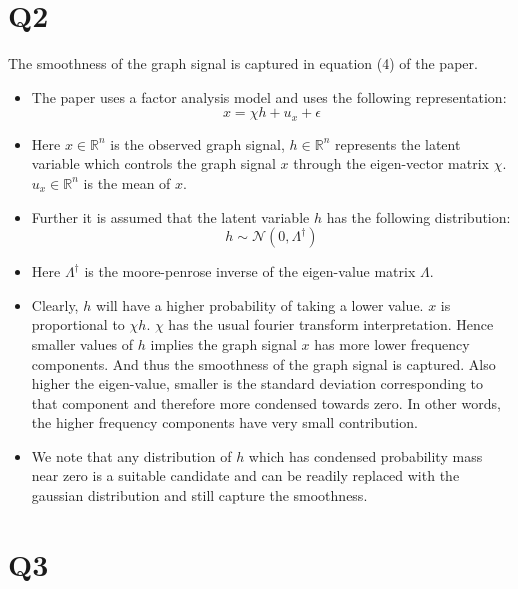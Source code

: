 \documentclass{article}
\begin{document}
\section*{Q2}
The smoothness of the graph signal is captured in equation (4) of the paper.
\begin{itemize}
\item The paper uses a factor analysis model and uses the following representation:
  $$ x = \chi h + u_x + \epsilon$$
\item Here $x \in \mathbb{R}^n$ is the observed graph signal, $h \in \mathbb{R}^n$ represents the latent variable which controls the graph signal $x$ through the eigen-vector matrix $\chi$. $u_x \in \mathbb{R}^n$ is the mean of $x$.
\item Further it is assumed that the latent variable $h$ has the following distribution:
  $$h \sim \mathcal{N}(0, \Lambda^{\dagger})$$
\item Here $\Lambda^{\dagger}$ is the moore-penrose inverse of the eigen-value matrix $\Lambda$.
\item Clearly, $h$ will have a higher probability of taking a lower value. $x$ is proportional to $\chi h$. $\chi$ has the usual fourier transform interpretation. Hence smaller values of $h$ implies the graph signal $x$ has more lower frequency components. And thus the smoothness of the graph signal is captured. Also higher the eigen-value, smaller is the standard deviation corresponding to that component and therefore more condensed towards zero. In other words, the higher frequency components have very small contribution.
\item We note that any distribution of $h$ which has condensed probability mass near zero is a suitable candidate and can be readily replaced with the gaussian distribution and still capture the smoothness.
\end{itemize}

\section*{Q3}
\end{document}
